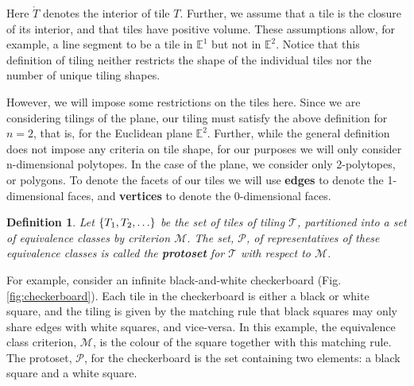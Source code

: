 \documentclass[]{article}
\newtheorem{mydef}{Definition}
\begin{document}
Here $\mathring{T}$ denotes the interior of tile $T$. Further, we assume that a tile is the closure of its interior, and that tiles have positive volume. These assumptions allow, for example, a line segment to be a tile in $\mathbb{E}^1$ but not in $\mathbb{E}^2$. Notice that this definition of tiling neither restricts the shape of the individual tiles nor the number of unique tiling shapes.  

However, we will impose some restrictions on the tiles here. Since we are considering tilings of the plane, our tiling must satisfy the above definition for $n=2$, that is, for the Euclidean plane $\mathbb{E}^2$. Further, while the general definition does not impose any criteria on tile shape, for our purposes we will only consider n-dimensional polytopes. In the case of the plane, we consider only 2-polytopes, or polygons. To denote the facets of our tiles we will use \textbf{edges} to denote the 1-dimensional faces, and \textbf{vertices} to denote the 0-dimensional faces. 

\begin{mydef}
Let $\{T_1,T_2,\mathellipsis\}$ be the set of tiles of tiling $\mathcal{T}$, partitioned into a set of equivalence classes by criterion $\mathcal{M}$. The set, $\mathcal{P}$, of representatives of these equivalence classes is called the \textbf{protoset} for $\mathcal{T}$ with respect to $\mathcal{M}$.
\end{mydef}

For example, consider an infinite black-and-white checkerboard (Fig.\ref{fig:checkerboard}). Each tile in the checkerboard is either a black or white square, and the tiling is given by the matching rule that black squares may only share edges with white squares, and vice-versa. In this example, the equivalence class criterion, $\mathcal{M}$, is the colour of the square together with this matching rule. The protoset, $\mathcal{P}$, for the checkerboard is the set containing two elements: a black square and a white square.
\end{document}
